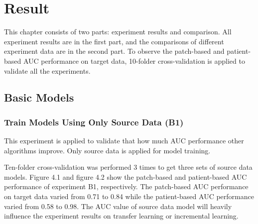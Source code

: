\chapter{Result}
 This chapter consists of two parts: experiment results and comparison. All experiment results are in the first part, and the comparisons of different experiment data are in the second part. To observe the patch-based and patient-based AUC performance on target data, 10-folder cross-validation is applied to validate all the experiments.

\section{Basic Models}
\subsection{Train Models Using Only Source Data (B1)}
This experiment is applied to validate that how much AUC performance other algorithms improve. Only source data is applied for model training. 

Ten-folder cross-validation was performed 3 times to get three sets of source data models. Figure 4.1 and figure 4.2 show the patch-based and patient-based AUC performance of experiment B1, respectively. The patch-based AUC performance on target data varied from 0.71 to 0.84 while the patient-based AUC performance varied from 0.58 to 0.98. The AUC value of source data model will heavily influence the experiment results on transfer learning or incremental learning. \\

